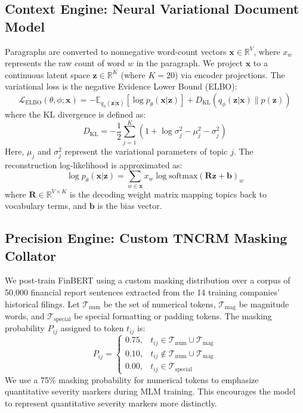 \documentclass[journal]{IEEEtran}
\begin{document}
\subsection{Context Engine: Neural Variational Document Model}
Paragraphs are converted to nonnegative word-count vectors $\mathbf{x} \in \mathbb{R}^{V}$, where $x_w$ represents the raw count of word $w$ in the paragraph. We project $\mathbf{x}$ to a continuous latent space $\mathbf{z} \in \mathbb{R}^{K}$ (where $K=20$) via encoder projections. The variational loss is the negative Evidence Lower Bound (ELBO):
\begin{equation}
\mathcal{L}_{\text{ELBO}}(\theta, \phi; \mathbf{x}) = -\mathbb{E}_{q_\phi(\mathbf{z}|\mathbf{x})}[\log p_\theta(\mathbf{x}|\mathbf{z})] + D_{\text{KL}}(q_\phi(\mathbf{z}|\mathbf{x}) \parallel p(\mathbf{z}))
\end{equation}
where the KL divergence is defined as:
\begin{equation}
D_{\text{KL}} = -\frac{1}{2} \sum_{j=1}^{K} \left( 1 + \log \sigma_j^2 - \mu_j^2 - \sigma_j^2 \right)
\end{equation}
Here, $\mu_j$ and $\sigma_j^2$ represent the variational parameters of topic $j$. The reconstruction log-likelihood is approximated as:
\begin{equation}
\log p_\theta(\mathbf{x}|\mathbf{z}) = \sum_{w \in \mathbf{x}} x_w \log \text{softmax}(\mathbf{R}\mathbf{z} + \mathbf{b})_w
\end{equation}
where $\mathbf{R} \in \mathbb{R}^{V \times K}$ is the decoding weight matrix mapping topics back to vocabulary terms, and $\mathbf{b}$ is the bias vector.

\subsection{Precision Engine: Custom TNCRM Masking Collator}
We post-train FinBERT using a custom masking distribution over a corpus of 50,000 financial report sentences extracted from the 14 training companies' historical filings. Let $\mathcal{T}_{\text{num}}$ be the set of numerical tokens, $\mathcal{T}_{\text{mag}}$ be magnitude words, and $\mathcal{T}_{\text{special}}$ be special formatting or padding tokens. The masking probability $P_{ij}$ assigned to token $t_{ij}$ is:
\begin{equation}
P_{ij} = \begin{cases} 
0.75, & t_{ij} \in \mathcal{T}_{\text{num}} \cup \mathcal{T}_{\text{mag}} \\
0.10, & t_{ij} \notin \mathcal{T}_{\text{num}} \cup \mathcal{T}_{\text{mag}} \\
0.00, & t_{ij} \in \mathcal{T}_{\text{special}}
\end{cases}
\end{equation}
We use a 75\% masking probability for numerical tokens to emphasize quantitative severity markers during MLM training. This encourages the model to represent quantitative severity markers more distinctly.
\end{document}
